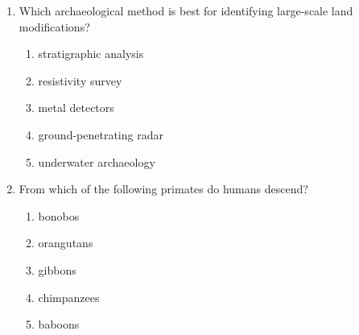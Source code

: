 \documentclass[12pt]{article}
\begin{document}
\begin{enumerate}[label=\arabic*.]
\begin{enumerate}[label=(\alph*)]
\end{enumerate}
\item Which archaeological method is best for identifying large-scale land modifications?
\begin{enumerate}[label=(\alph*)]
    \item stratigraphic analysis
    \item resistivity survey
    \item metal detectors
    \item ground-penetrating radar
    \item underwater archaeology
\end{enumerate}
\item From which of the following primates do humans descend?
\begin{enumerate}[label=(\alph*)]
    \item bonobos
    \item orangutans
    \item gibbons
    \item chimpanzees
    \item baboons
\end{enumerate}
\end{enumerate}
\end{document}
